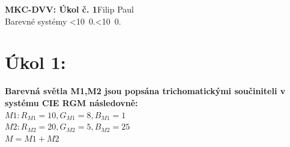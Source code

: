 \documentclass[10pt, a4paper]{article}%
\def\mydate{\leavevmode\hbox{\twodigits\day.\twodigits\month.\the\year}}
\def\twodigits#1{\ifnum#1<10 0\fi\the#1}
\begin{document}
\begin{flushleft}%
	\textbf{\Large{MKC-DVV: Úkol č. 1}}\hfill Filip Paul\\
	\large{Barevné systémy \hfill\mydate}
\end{flushleft}


	\section{\Large Úkol 1:}
	\noindent \textbf{Barevná světla M1,M2 jsou popsána trichomatickými součiniteli v systému CIE RGM následovně:}\\
	$M1: R_{M1} = 10, G_{M1} = 8, B_{M1} = 1$\\
	$M2: R_{M2} = 20, G_{M2} = 5, B_{M2} = 25$\\
	$M = M1 + M2$\\
\end{document}
